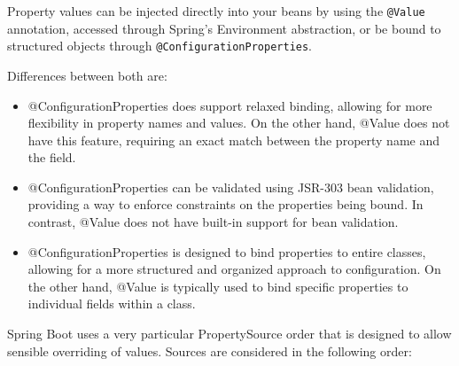 \documentclass{scrartcl}
\begin{document}
Property values can be injected directly into your beans by using the \lstinline |@Value| annotation, accessed through Spring’s Environment abstraction, or be bound to structured objects through \lstinline[]|@ConfigurationProperties|.

Differences between both are:

\begin{itemize}
    \item @ConfigurationProperties does support relaxed binding, allowing for more flexibility in property names and values. On the other hand, @Value does not have this feature, requiring an exact match between the property name and the field.
    \item @ConfigurationProperties can be validated using JSR-303 bean validation, providing a way to enforce constraints on the properties being bound. In contrast, @Value does not have built-in support for bean validation.
    \item @ConfigurationProperties is designed to bind properties to entire classes, allowing for a more structured and organized approach to configuration. On the other hand, @Value is typically used to bind specific properties to individual fields within a class.
\end{itemize}

Spring Boot uses a very particular PropertySource order that is designed to allow sensible overriding of values. Sources are considered in the following order:
\end{document}
